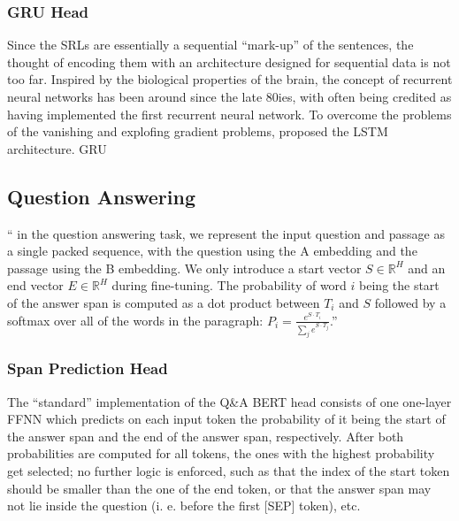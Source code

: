 \subsubsection{GRU Head}

Since the SRLs are essentially a sequential ``mark-up'' of the sentences, the thought of
encoding them with an architecture designed for sequential data is not too far. Inspired by
the biological properties of the brain, the concept of recurrent neural networks has been
around since the late 80ies, with \citep{hopfield1982neural} often being credited as having
implemented the first recurrent neural network. To overcome the problems of the vanishing
and explofing gradient problems, \citep{hochreiter1997long} proposed the LSTM architecture.
\citep{cho2014learning} GRU






\subsection{Question Answering}
\label{sec:question-answering}



``\textelp{} in the question answering task, we represent the input question and passage as
a single packed sequence, with the question using the A embedding and the passage using the
B embedding. We only introduce a start vector $S \in \mathbb{R}^H$ and an end vector $E \in
\mathbb{R}^H$ during fine-tuning. The probability of word $i$ being the start of the answer
span is computed as a dot product between $T_i$ and $S$ followed by a softmax over all of the
words in the paragraph: $P_i = \frac{e^{S\cdot T_i}}{\sum_{j}^{} e^{S\cdot T_j}}$.'' \citep{devlin2018bert}


\subsubsection{Span Prediction Head}

The ``standard'' implementation of the Q\&A BERT head consists of one one-layer FFNN which predicts
on each input token the probability of it being the start of the answer span and the end of the
answer span, respectively. After both probabilities are computed for all tokens, the ones with
the highest probability get selected; no further logic is enforced, such as that the index of
the start token should be smaller than the one of the end token, or that the answer span may
not lie inside the question (i. e. before the first [SEP] token), etc.

